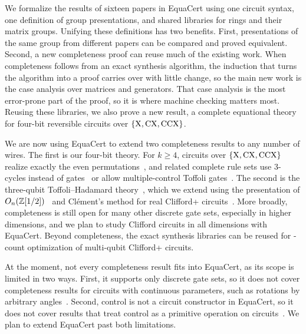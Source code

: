\documentclass[acmsmall,screen,nonacm]{acmart}
\begin{document}
We formalize the results of sixteen papers in EquaCert using one circuit syntax, one definition of group presentations, and shared libraries for rings and their matrix groups. Unifying these definitions has two benefits. First, presentations of the same group from different papers can be compared and proved equivalent. Second, a new completeness proof can reuse much of the existing work. When completeness follows from an exact synthesis algorithm, the induction that turns the algorithm into a proof carries over with little change, so the main new work is the case analysis over matrices and generators. That case analysis is the most error-prone part of the proof, so it is where machine checking matters most. Reusing these libraries, we also prove a new result, a complete equational theory for four-bit reversible circuits over $\{\mathrm{X},\mathrm{CX},\mathrm{CCX}\}$.

We are now using EquaCert to extend two completeness results to any number of wires. The first is our four-bit theory. For $k\ge4$, circuits over $\{\mathrm{X},\mathrm{CX},\mathrm{CCX}\}$ realize exactly the even permutations~\cite{shende2003synthesis}, and related complete rule sets use $3$-cycles instead of gates~\cite{lafont2003boolean} or allow multiple-control Toffoli gates~\cite{feng2026complete,feng2026ancillas}. The second is the three-qubit Toffoli--Hadamard theory~\cite{amy2024toffoli}, which we extend using the presentation of $O_n(\mathbb{Z}[1/2])$~\cite{li2021on} and Cl\'ement's method for real Clifford+\CH{} circuits~\cite{clement2026realcliffordch}. More broadly, completeness is still open for many other discrete gate sets, especially in higher dimensions, and we plan to study Clifford circuits in all dimensions with EquaCert. Beyond completeness, the exact synthesis libraries can be reused for \T-count optimization of multi-qubit Clifford+\T{} circuits.

At the moment, not every completeness result fits into EquaCert, as its scope is limited in two ways. First, it supports only discrete gate sets, so it does not cover completeness results for circuits with continuous parameters, such as rotations by arbitrary angles~\cite{clement2023complete,clement2024extensions,clement2024minimal}. Second, control is not a circuit constructor in EquaCert, so it does not cover results that treat control as a primitive operation on circuits~\cite{delorme2026control,schober2026control,blake2026qudit}. We plan to extend EquaCert past both limitations.
\end{document}
